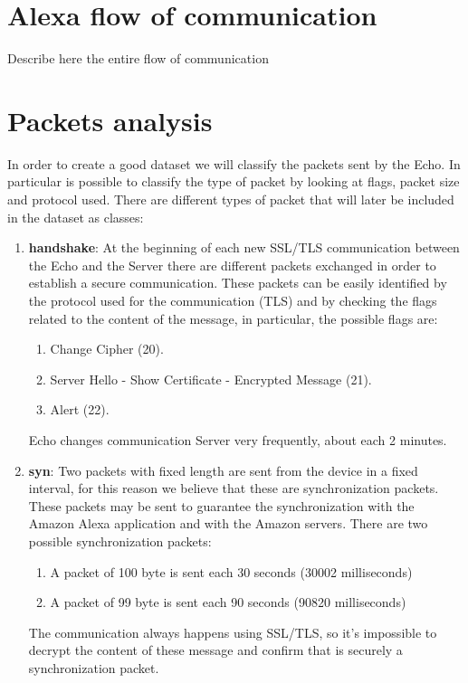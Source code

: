 \documentclass[sigconf]{acmart}
\begin{document}
    \section{Alexa flow of communication}
    Describe here the entire flow of communication

    \section{Packets analysis}
    In order to create a good dataset we will classify the packets sent by the Echo.
    In particular is possible to classify the type of packet by looking at flags, packet size and protocol used.
    There are different types of packet that will later be included in the dataset as classes:
    \begin{enumerate}
        \item \textbf{handshake}: At the beginning of each new SSL/TLS communication between the Echo and the Server there are different packets exchanged in order to establish a secure communication.
        These packets can be easily identified by the protocol used for the communication (TLS) and by checking the flags related to the content of the message, in particular, the possible flags are:
        \begin{enumerate}
            \item Change Cipher (20).
            \item Server Hello - Show Certificate - Encrypted Message (21).
            \item Alert (22).
        \end{enumerate}
        Echo changes communication Server very frequently, about each 2 minutes.
        \item \textbf{syn}: Two packets with fixed length are sent from the device in a fixed interval, for this reason we believe that these are synchronization packets.
        These packets may be sent to guarantee the synchronization with the Amazon Alexa application and with the Amazon servers.
        There are two possible synchronization packets:
        \begin{enumerate}
            \item A packet of 100 byte is sent each 30 seconds (30002 milliseconds)
            \item A packet of 99 byte is sent each 90 seconds (90820 milliseconds)
        \end{enumerate}
        The communication always happens using SSL/TLS, so it's impossible to decrypt the content of these message and confirm that is securely a synchronization packet.

\end{enumerate}
\end{document}
